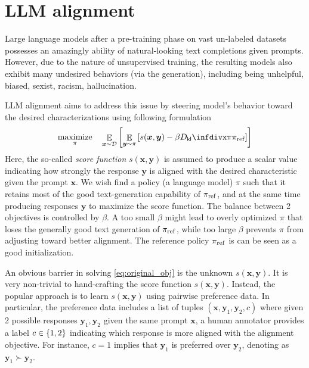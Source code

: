 \documentclass[11pt,a4paper]{article}
\begin{document}
\section{LLM alignment}%
\label{sec:introduction}
Large language models after a pre-training phase on vast un-labeled datasets possesses an amazingly ability of  natural-looking text completions given prompts. However, due to the nature of unsupervised training, the resulting models also exhibit many undesired behaviors (via the generation), including being unhelpful, biased, sexist, racism, hallucination.

LLM alignment aims to address this issue by steering model's behavior toward the desired characterizations using following formulation
\begin{equation}
\label{eq:original_obj}
\maximize_{\pi} \quad  \mathop{\mathbb{E}}_{\bm{x} \sim \mathcal{D}} \left[  \mathop{\mathbb{E}}_{\bm{y} \sim \pi} \left[ s(\bm{x}, \bm{y})  - \beta \Dkl{\pi}{\pi_{\rm ref}}\right]
\right] 
\end{equation}
Here, the so-called \textit{score function} $s(\bm{x}, \bm{y})$ is assumed to produce a scalar value indicating how strongly the response $\bm{y}$ is aligned with the desired characteristic given the prompt $\bm{x}$.
We wish find a policy (a language model) $\pi$ such that it retains most of the good text-generation capability of $\pi_{\rm ref}$, and at the same time producing responses $\bm{y}$ to maximize the score function.
The balance between 2 objectives is controlled by $\beta$. A too small $\beta$ might lead to overly optimized $\pi$ that loses the generally good text generation of $\pi_{\rm ref}$, while too large $\beta$ prevents $\pi$ from adjusting toward better alignment.
The reference policy $\pi_{\rm ref}$ is can be seen as a good initialization.

An obvious barrier in solving \eqref{eq:original_obj} is the unknown $s(\bm{x}, \bm{y})$. It is very non-trivial to hand-crafting the score function $s(\bm{x}, \bm{y})$. Instead, the popular approach is to learn $s(\bm{x}, \bm{y})$ using pairwise preference data. 
In particular, the preference data includes a list of tuples $(\bm{x}, \bm{y}_1, \bm{y}_2, c)$ where given 2 possible responses $\bm{y}_1, \bm{y}_2$ given the same prompt $\bm{x}$, a human annotator provides a label $c\in \left\{1,2\right\}$ indicating which response is more aligned with the alignment objective. For instance, $c=1$ implies that $\bm{y}_1$ is preferred over $\bm{y}_2$, denoting as $\bm{y}_1 \succ \bm{y}_2$.
\end{document}
